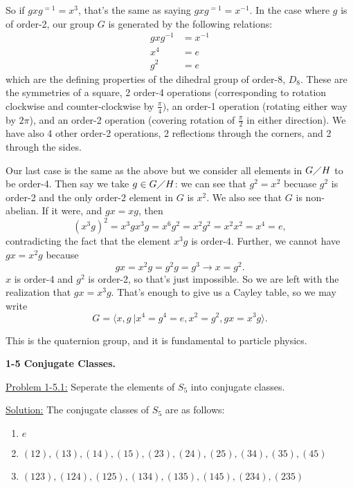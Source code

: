\documentclass[12pt]{article}
\begin{document}
So if $gxg^{=1} = x^3$, that's the same as saying $gxg^{=1} = x^{-1}$. In the
case where $g$ is of order-2, our group $G$ is generated by the following
relations:
\begin{align*}
    gxg^{-1} &= x^{-1}\\
         x^4 &= e\\
         g^2 &=e
\end{align*}
which are the defining properties of the dihedral group of order-8, $D_8$.
These are the symmetries of a square, 2 order-4 operations (corresponding to
rotation clockwise and counter-clockwise by $\frac{\pi}{4})$, an order-1
operation (rotating either way by  $2\pi$), and an order-2 operation (covering
rotation of  $\frac{\pi}{2}$ in either direction). We have also 4 other
order-2 operations, 2 reflections through the corners, and 2 through the sides.

Our last case is the same as the above but we consider all elements in
$G \diagup H$ to be order-4. Then say we take $g \in G \diagup H$: we can see
that $g^2 = x^2$ becuase $g^2$ is order-2 and the only order-2 element in $G$
is $x^2$. We also see that $G$ is non-abelian. If it were, and $gx = xg$, then
\[
    (x^3g)^2 = x^3gx^3g = x^6g^2 = x^2g^2 = x^2x^2 = x^4 = e, 
\]
contradicting the fact that the element $x^3g$ is order-4. Further, we cannot
have $gx = x^2g$ because
\[
gx = x^2g = g^2g = g^3 \rightarrow x = g^2.
\]
$x$ is order-4 and $g^2$ is order-2, so that's just impossible. So we are left
with the realization that $gx = x^3g$. That's enough to give us a Cayley table,
so we may write
\[
 G = \langle x, g\ | x^4 = g^4 = e, x^2 = g^2, gx = x^3g \rangle.
\]

This is the quaternion group, and it is fundamental to particle physics.

\newpage

\textbf{1-5 Conjugate Classes.}

\underline{Problem 1-5.1:} Seperate the elements of $S_5$ into conjugate
classes.

\underline{Solution:} The conjugate classes of $S_5$ are as follows:
\begin{enumerate}
    \item $e$
    \item $(12), (13), (14), (15), (23), (24), (25), (34), (35), (45)$
    \item $(123), (124), (125), (134), (135), (145), (234), (235)$
\end{enumerate}
\end{document}
